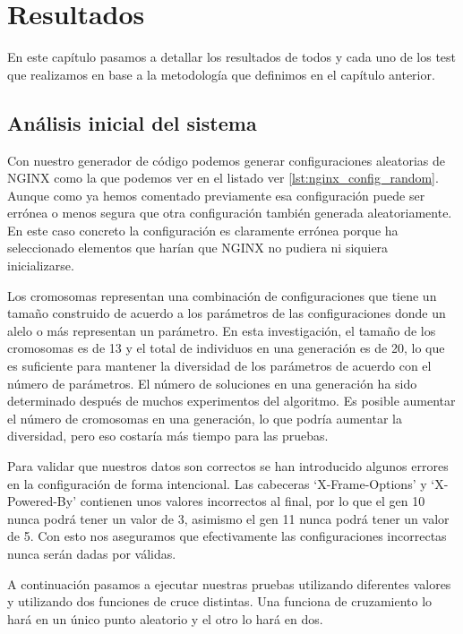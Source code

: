 \chapter{Resultados}

En este capítulo pasamos a detallar los resultados de todos y cada uno de los test que realizamos en base a la metodología que definimos en el capítulo anterior.

\section{Análisis inicial del sistema}

Con nuestro generador de código podemos generar configuraciones aleatorias de NGINX como la que podemos ver en el listado ver \ref{lst:nginx_config_random}. Aunque como ya hemos comentado previamente esa configuración puede ser errónea o menos segura que otra configuración también generada aleatoriamente. En este caso concreto la configuración es claramente errónea porque ha seleccionado elementos que harían que NGINX no pudiera ni siquiera inicializarse.

\bigskip
Los cromosomas representan una combinación de configuraciones que tiene un tamaño construido de acuerdo a los parámetros de las configuraciones donde un alelo o más representan un parámetro. En esta investigación, el tamaño de los cromosomas es de 13 y el total de individuos en una generación es de 20, lo que es suficiente para mantener la diversidad de los parámetros de acuerdo con el número de parámetros. El número de soluciones en una generación ha sido determinado después de muchos experimentos del algoritmo. Es posible aumentar el número de cromosomas en una generación, lo que podría aumentar la diversidad, pero eso costaría más tiempo para las pruebas.

\bigskip
Para validar que nuestros datos son correctos se han introducido algunos errores en la configuración de forma intencional. Las cabeceras `X-Frame-Options' y `X-Powered-By' contienen unos valores incorrectos al final, por lo que el gen 10 nunca podrá tener un valor de 3, asimismo el gen 11 nunca podrá tener un valor de 5. Con esto nos aseguramos que efectivamente las configuraciones incorrectas nunca serán dadas por válidas.

\bigskip
A continuación pasamos a ejecutar nuestras pruebas utilizando diferentes valores y utilizando dos funciones de cruce distintas. Una funciona de cruzamiento lo hará en un único punto aleatorio y el otro lo hará en dos.

